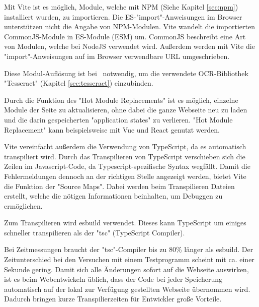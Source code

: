 
\label{sec:npm-dependency-resolving}

Mit Vite ist es möglich, Module, welche mit NPM (Siehe Kapitel \ref{sec:npm}) installiert wurden, zu importieren. 
Die ES-"import"-Anweisungen im Browser unterstützen nicht die Angabe von NPM-Modulen. Vite wandelt die importierten CommonJS-Module in ES-Module (ESM) um. CommonJS beschreibt eine Art von Modulen, welche bei NodeJS verwendet wird. Außerdem werden mit Vite die "import"-Anweisungen auf im Browser verwendbare URL umgeschrieben. \cite{ViteFeatures}


Diese Modul-Auflösung ist bei \ZELIA\ notwendig, um die verwendete OCR-Bibliothek "Tesseract" (Kapitel \ref{sec:tesseract}) einzubinden. 

\label{sec:hot-module-replacement}

Durch die Funktion des "Hot Module Replacements" ist es möglich, einzelne Module der Seite zu aktualisieren, ohne dabei die ganze Webseite neu zu laden und die darin gespeicherten "application states" zu verlieren. "Hot Module Replacement" kann beispielsweise mit Vue und React genutzt werden. \cite{ViteFeatures}
  
 \label{sec:typescript-vite}

Vite vereinfacht außerdem die Verwendung von TypeScript, da es automatisch transpiliert wird. 
Durch das Transpilieren von TypeScript verschieben sich die Zeilen im Javascript-Code, da Typescript-spezifische Syntax wegfällt. 
Damit die Fehler\-meldungen dennoch an der richtigen Stelle angezeigt werden, bietet Vite die Funktion der "Source Maps". 
Dabei werden beim Transpilieren Dateien erstellt, welche die nötigen Informationen beinhalten, um Debuggen zu ermöglichen.

Zum Transpilieren wird esbuild \cite{esbuild} verwendet. Dieses kann TypeScript um einiges schneller transpilieren als der "tsc" (TypeScript Compiler). \cite{ViteFeatures}

Bei Zeitmessungen braucht der "tsc"-Compiler bis zu 80\% länger als esbuild. Der Zeitunterschied bei den Versuchen mit einem Testprogramm scheint mit ca. einer Sekunde gering. 
Damit sich alle Änderungen sofort auf die Webseite auswirken, ist es beim Web\-entwickeln üblich, dass der Code bei jeder Speicherung automatisch auf der lokal zur Verfügung gestellten Webseite übernommen wird. Dadurch bringen kurze Transpilierzeiten für Entwickler große Vorteile. 

